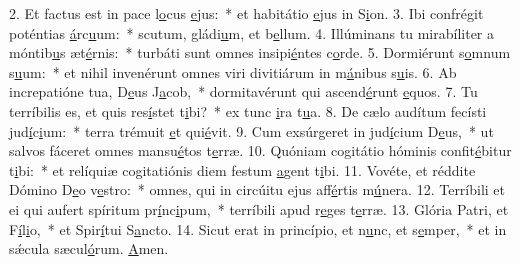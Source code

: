 2. Et factus est in pace l\uline{o}cus \uline{e}jus:~* et habitátio \uline{e}jus in S\uline{i}on.
3. Ibi confrégit poténtias \uline{á}rc\uline{u}um:~* scutum, gládi\uline{u}m, et b\uline{e}llum.
4. Illúminans tu mirabíliter a móntib\uline{u}s æt\uline{é}rnis:~* turbáti sunt omnes insipi\uline{é}ntes c\uline{o}rde.
5. Dormiérunt s\uline{o}mnum s\uline{u}um:~* et nihil invenérunt omnes viri divitiárum in m\uline{á}nibus s\uline{u}is.
6. Ab increpatióne tua, D\uline{e}us J\uline{a}cob,~* dormitavérunt qui ascend\uline{é}runt \uline{e}quos.
7. Tu terríbilis es, et quis res\uline{í}stet t\uline{i}bi?~* ex tunc \uline{i}ra t\uline{u}a.
8. De cælo audítum fecísti jud\uline{í}c\uline{i}um:~* terra trémuit \uline{e}t qui\uline{é}vit.
9. Cum exsúrgeret in jud\uline{í}cium D\uline{e}us,~* ut salvos fáceret omnes mansu\uline{é}tos t\uline{e}rræ.
10. Quóniam cogitátio hóminis confit\uline{é}bitur t\uline{i}bi:~* et relíquiæ cogitatiónis diem festum \uline{a}gent t\uline{i}bi.
11. Vovéte, et réddite Dómino D\uline{e}o v\uline{e}stro:~* omnes, qui in circúitu ejus aff\uline{é}rtis m\uline{ú}nera.
12. Terríbili et ei qui aufert spíritum pr\uline{í}nc\uline{i}pum,~* terríbili apud r\uline{e}ges t\uline{e}rræ.
13. Glória Patri, et F\uline{í}l\uline{i}o,~* et Spir\uline{í}tui S\uline{a}ncto.
14. Sicut erat in princípio, et n\uline{u}nc, et s\uline{e}mper,~* et in sǽcula sæcul\uline{ó}rum. \uline{A}men.
